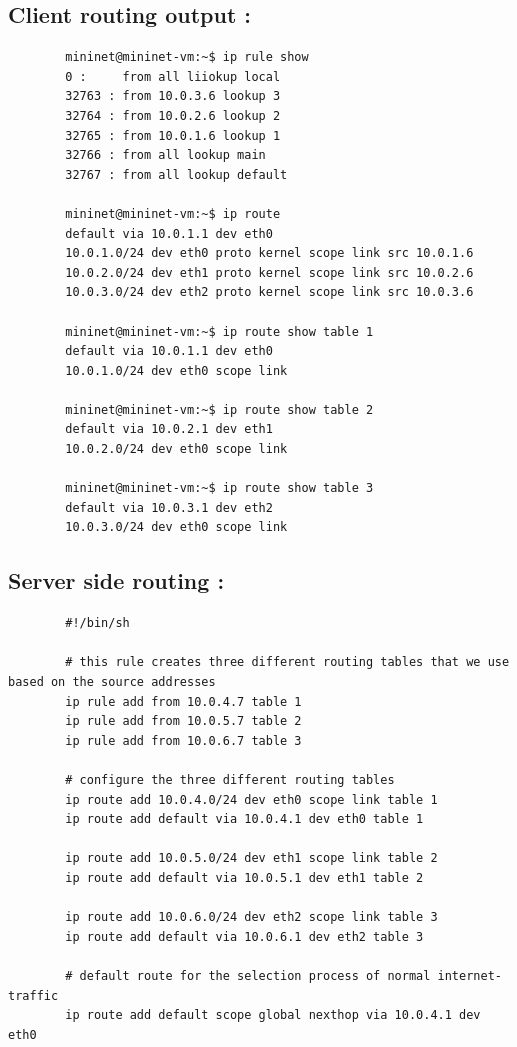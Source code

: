 \documentclass[a4paper,11pt]{article}
\begin{document}
	 	\subsection{Client routing output :}
	 	\label{subsec:clientrouteout}
	 	\begin{lstlisting}
	 	mininet@mininet-vm:~$ ip rule show
	 	0 : 	from all liiokup local
	 	32763 : from 10.0.3.6 lookup 3
	 	32764 : from 10.0.2.6 lookup 2
	 	32765 : from 10.0.1.6 lookup 1
	 	32766 : from all lookup main
	 	32767 : from all lookup default

	 	mininet@mininet-vm:~$ ip route
	 	default via 10.0.1.1 dev eth0
	 	10.0.1.0/24 dev eth0 proto kernel scope link src 10.0.1.6
	 	10.0.2.0/24 dev eth1 proto kernel scope link src 10.0.2.6
	 	10.0.3.0/24 dev eth2 proto kernel scope link src 10.0.3.6

	 	mininet@mininet-vm:~$ ip route show table 1
	 	default via 10.0.1.1 dev eth0
	 	10.0.1.0/24 dev eth0 scope link

	 	mininet@mininet-vm:~$ ip route show table 2
	 	default via 10.0.2.1 dev eth1
	 	10.0.2.0/24 dev eth0 scope link

	 	mininet@mininet-vm:~$ ip route show table 3
	 	default via 10.0.3.1 dev eth2
	 	10.0.3.0/24 dev eth0 scope link
	 	\end{lstlisting}

	 	\subsection{Server side routing :}
	 	\label{subsec:serverroute}
	 	\begin{lstlisting}
	 	#!/bin/sh

	 	# this rule creates three different routing tables that we use based on the source addresses
	 	ip rule add from 10.0.4.7 table 1
	 	ip rule add from 10.0.5.7 table 2
	 	ip rule add from 10.0.6.7 table 3

	 	# configure the three different routing tables
	 	ip route add 10.0.4.0/24 dev eth0 scope link table 1
	 	ip route add default via 10.0.4.1 dev eth0 table 1

	 	ip route add 10.0.5.0/24 dev eth1 scope link table 2
	 	ip route add default via 10.0.5.1 dev eth1 table 2

	 	ip route add 10.0.6.0/24 dev eth2 scope link table 3
	 	ip route add default via 10.0.6.1 dev eth2 table 3

	 	# default route for the selection process of normal internet-traffic
	 	ip route add default scope global nexthop via 10.0.4.1 dev eth0
	 	\end{lstlisting}
\end{document}

